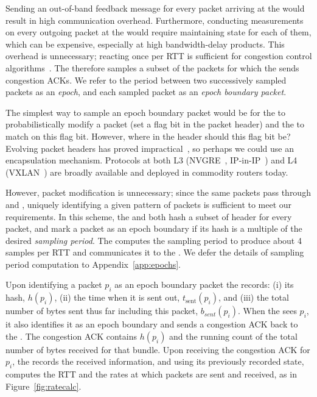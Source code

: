 Sending an out-of-band feedback message for every packet arriving at the \outbox would result in high communication overhead. 
Furthermore, conducting measurements on every outgoing packet at the \inbox would require maintaining state for each of them, which can be expensive, especially at high bandwidth-delay products. 
This overhead is unnecessary; reacting once per RTT is sufficient for congestion control algorithms~\cite{ccp}. 
The \inbox therefore samples a subset of the packets for which the \outbox sends congestion ACKs.
We refer to the period between two successively sampled packets as an \emph{epoch}, and each sampled packet as an \emph{epoch boundary packet}.

The simplest way to sample an epoch boundary packet would be for the \inbox to probabilistically modify a packet (\ie set a flag bit in the packet header) and the \outbox to match on this flag bit.
However, where in the header should this flag bit be?
Evolving packet headers has proved impractical~\cite{trotsky}, so perhaps we could use an encapsulation mechanism.
Protocols at both L3 (\eg NVGRE~\cite{nvgre}, IP-in-IP~\cite{ipinip}) and L4 (\eg VXLAN~\cite{vxlan}) are broadly available and deployed in commodity routers today.

However, packet modification is unnecessary; since the same packets pass through \inbox and \outbox, uniquely identifying a given pattern of packets is sufficient to meet our requirements. In this scheme, the \inbox and \outbox both hash a subset of header for every packet, and mark a packet as an epoch boundary if its hash is a multiple of the desired \emph{sampling period}. The \inbox computes the sampling period to produce about 4 samples per RTT and communicates it to the \outbox. We defer the details of sampling period computation to Appendix~\ref{app:epochs}. 

Upon identifying a packet $p_i$ as an epoch boundary packet the \inbox records: 
(i) its hash, $h(p_i)$, 
(ii) the time when it is sent out, $t_{\text{sent}}(p_i)$, 
and (iii) the total number of bytes sent thus far including this packet, $b_{sent}(p_i)$. 
When the \outbox sees $p_i$, it also identifies it as an epoch boundary and sends a congestion ACK back to the \inbox. 
The congestion ACK contains $h(p_i)$ and the running count of the total number of bytes received for that bundle. 
Upon receiving the congestion ACK for $p_i$, the \inbox records the received information, and using its previously recorded state, computes the RTT and the rates at which packets are sent and received, as in Figure~\ref{fig:ratecalc}.

